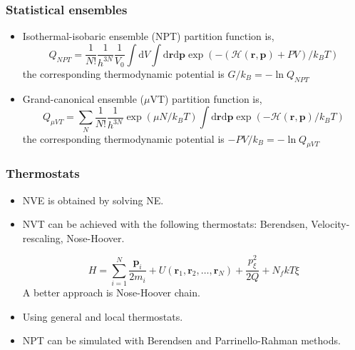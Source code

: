 \documentclass{beamer}
\begin{document}


\begin{frame}\frametitle{Statistical ensembles}

\begin{itemize}
\item Isothermal-isobaric ensemble (NPT) partition function is,
	\begin{equation}
		Q_{NPT}= \frac{1}{N!}\frac{1}{h^{3N}} \frac{1}{V_0} \int \textrm{d}V
		\int \textrm{d}\mathbf{r} \textrm{d}\mathbf{p} 
		\exp ( -(\mathcal{H}(\mathbf{r},\mathbf{p}) + PV)/k_BT)
	\end{equation}
	the corresponding thermodynamic potential is $G/k_{B} = -\ln Q_{NPT}$

\item Grand-canonical ensemble ($\mu$VT) partition function is,
	\begin{equation}
		Q_{\mu VT}= \sum_N \frac{1}{N!}\frac{1}{h^{3N}} \exp(\mu N/k_BT) 
		\int \textrm{d}\mathbf{r} \textrm{d}\mathbf{p} 
		\exp ( -\mathcal{H}(\mathbf{r},\mathbf{p}) /k_BT)
	\end{equation}
	the corresponding thermodynamic potential is $-PV/k_{B} = -\ln Q_{\mu VT}$

\end{itemize}

\end{frame}

\begin{frame}\frametitle{Thermostats}

\begin{itemize}
	\item NVE is obtained by solving NE.
	\item NVT can be achieved with the following thermostats: Berendsen, Velocity-rescaling,
		Nose-Hoover.

\begin{equation}
	H= \sum_{i=1}^{N} \frac{\mathbf{p}_i}{2m_i} + U(\mathbf{r}_1,\mathbf{r}_2,\ldots, \mathbf{r}_N) + \frac{p_{\xi}^2}{2Q} 
	+ N_f kT\xi
\end{equation}
 A better approach is Nose-Hoover chain.

	\item  Using general and local thermostats. 

	\item NPT can be simulated with Berendsen and Parrinello-Rahman methods.
\end{itemize}

\end{frame}
\end{document}
